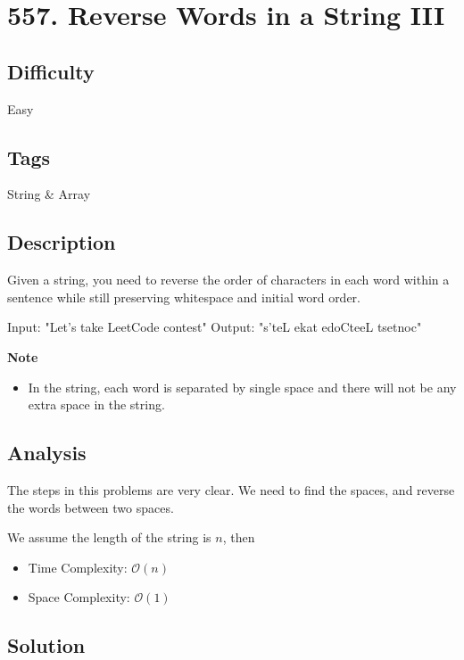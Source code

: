 \tocless\section{557. Reverse Words in a String III}
\label{algo:557}

\subsection*{Difficulty}
Easy

\subsection*{Tags}
String \& Array

\subsection*{Description}
Given a string, you need to reverse the order of characters in each word within a sentence while still preserving whitespace and initial word order.

\begin{example}
\begin{multilinecode}
Input: "Let's take LeetCode contest"
Output: "s'teL ekat edoCteeL tsetnoc"
\end{multilinecode}
\end{example}

\textbf{Note}
\begin{itemize}
    \item In the string, each word is separated by single space and there will not be any extra space in the string.
\end{itemize}

\subsection*{Analysis}
The steps in this problems are very clear. We need to find the spaces, and reverse the words between two spaces.

We assume the length of the string is $n$, then
\begin{itemize}
    \item Time Complexity: $\mathcal{O}(n)$
    \item Space Complexity: $\mathcal{O}(1)$
\end{itemize}

\subsection*{Solution}
